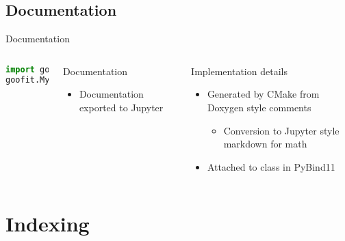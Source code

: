 \documentclass[aspectratio=169, smaller]{beamer}
\begin{document}
\subsection{Documentation}
\begin{frame}[fragile]{Documentation}
    \begin{columns}[c]
        \begin{lstlisting}[language=Python]
import goofit
goofit.MyPdf
        \end{lstlisting}
        \begin{block}{Documentation}
            \begin{itemize}
                \item Documentation exported to Jupyter
            \end{itemize}
        \end{block}
        \begin{block}{Implementation details}
            \begin{itemize}
                \item Generated by CMake from Doxygen style comments
                \begin{itemize}
                    \item Conversion to Jupyter style markdown for math
                \end{itemize}
                \item Attached to class in PyBind11
            \end{itemize}
        \end{block}
    \end{columns}
\end{frame}

\section{Indexing}
\end{document}
